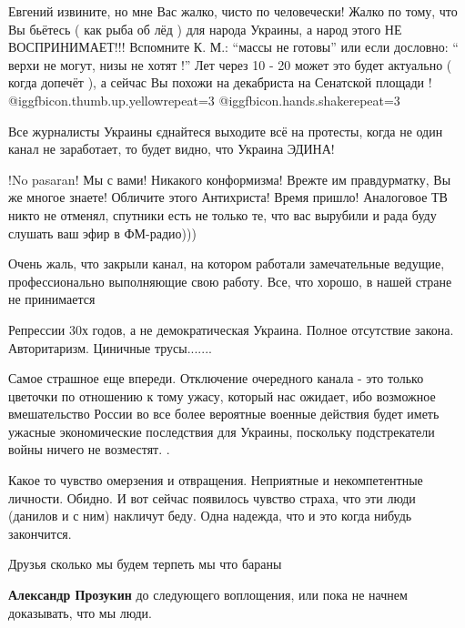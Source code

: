 \begin{itemize}

Евгений извините, но мне Вас жалко, чисто по человечески! Жалко по тому, что
Вы бьётесь ( как рыба об лёд ) для народа Украины, а народ этого НЕ
ВОСПРИНИМАЕТ!!! Вспомните К. М.: \enquote{массы не готовы} или если дословно: \enquote{
верхи не могут, низы не хотят !} Лет через 10 - 20 может это будет актуально (
когда допечёт ), а сейчас Вы похожи на декабриста на Сенатской площади !
 @igg{fbicon.thumb.up.yellow}{repeat=3}  @igg{fbicon.hands.shake}{repeat=3} 



Все журналисты Украины єднайтеся выходите всё на протесты, когда не один канал
не заработает, то будет видно, что Украина ЭДИНА!


!No pasaran! Мы с вами! Никакого конформизма! Врежте им правдурматку, Вы же
многое знаете! Обличите этого Антихриста! Время пришло! Аналоговое ТВ никто не
отменял, спутники есть не только те, что вас вырубили и рада буду слушать ваш
эфир в ФМ-радио)))


Очень жаль, что закрыли канал, на котором работали замечательные ведущие,
профессионально выполняющие свою работу. Все, что хорошо, в нашей стране не
принимается


Репрессии 30х годов, а не демократическая Украина. Полное отсутствие закона.
Авторитаризм. Циничные трусы.......


Самое страшное еще впереди. Отключение очередного канала - это только цветочки
по отношению к тому ужасу, который нас ожидает, ибо возможное вмешательство
России во все более вероятные военные действия будет иметь ужасные
экономические последствия для Украины, поскольку подстрекатели войны ничего не
возместят. .


Какое то чувство омерзения и отвращения. Неприятные и некомпетентные личности.
Обидно. И вот сейчас появилось чувство страха, что эти люди (данилов и с ним)
накличут беду. Одна надежда, что и это когда нибудь закончится.

Друзья сколько мы будем терпеть мы что бараны

\textbf{Александр Прозукин} до следующего воплощения, или пока не начнем доказывать, что мы люди.


\end{itemize}
